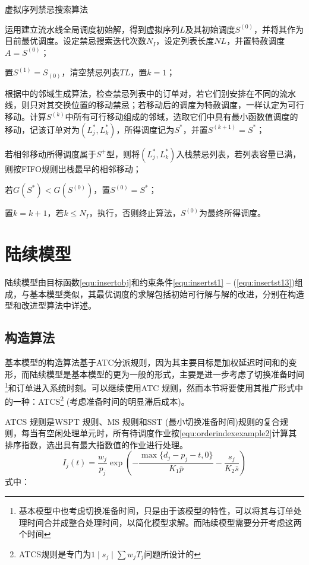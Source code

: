 \begin{algori}
虚拟序列禁忌搜索算法\label{alg:basicvirtual}
\begin{asparaenum}
\renewcommand{\labelenumi}{\bf Step\theenumi~}
\item 运用建立流水线全局调度初始解，得到虚拟序列$L$及其初始调度$S^{(0)}$，并将其作为目前最优调度。设定禁忌搜索迭代次数$N_I$，设定列表长度$NL$，并置特赦调度$A = S^{(0)}$；
\item 置$S^{(1)} = S_{(0)}$，清空禁忌列表$TL$，置$k = 1$；
\item 根据中的邻域生成算法，检查禁忌列表中的订单对，若它们别安排在不同的流水线，则只对其交换位置的移动禁忌；若移动后的调度为特赦调度，一样认定为可行移动。计算$S^{(k)}$中所有可行移动组成的邻域，选取它们中具有最小函数值调度的移动，记该订单对为$(L_j^*, L_k^*)$，所得调度记为$S^*$，并置$S^{(k+1)} = S^*$；
\item 若相邻移动所得调度属于$S^+$型，则将$(L_j^*, L_k^*)$入栈禁忌列表，若列表容量已满，则按FIFO规则出栈最早的相邻移动；
\item 若$G(S^*) < G(S^{(0)})$，置$S^{(0)} = S^*$；
\item 置$k = k + 1$，若$k\le N_I$，执行，否则终止算法，$S^{(0)}$为最终所得调度。
\end{asparaenum}
\end{algori}

\section{陆续模型}
陆续模型由目标函数\eqref{equ:insertobj}和约束条件\eqref{equ:insertst1} -- (\ref{equ:insertst13})组成，与基本模型类似，其最优调度的求解包括初始可行解与解的改进，分别在构造型和改进型算法中详述。
\subsection{构造算法}
基本模型的构造算法基于ATC分派规则，因为其主要目标是加权延迟时间和的变形，而陆续模型是基本模型的更为一般的形式，主要是进一步考虑了切换准备时间\footnote{基本模型中也考虑切换准备时间，只是由于该模型的特性，可以将其与订单处理时间合并成整合处理时间，以简化模型求解。而陆续模型需要分开考虑这两个时间}和订单进入系统时刻。可以继续使用ATC 规则，然而本节将要使用其推广形式中的一种：ATCS\footnote{ATCS规则是专门为$1\mid s_j\mid\sum w_jT_j$问题所设计的} (考虑准备时间的明显滞后成本)。

ATCS 规则是WSPT 规则、MS 规则和SST (最小切换准备时间)规则的复合规则，每当有空闲处理单元时，所有待调度作业按\eqref{equ:orderindexexample2}计算其排序指数，选出具有最大指数值的作业进行处理。
\begin{equation}
I_j(t) = \frac{w_j}{p_j}\exp\left(-\frac{\max\{d_j - p_j - t, 0\}}{K_1\bar p} - \frac{s_j}{K_2 \bar s}\right) \label{equ:orderindexexample2}
\end{equation}
式中：

